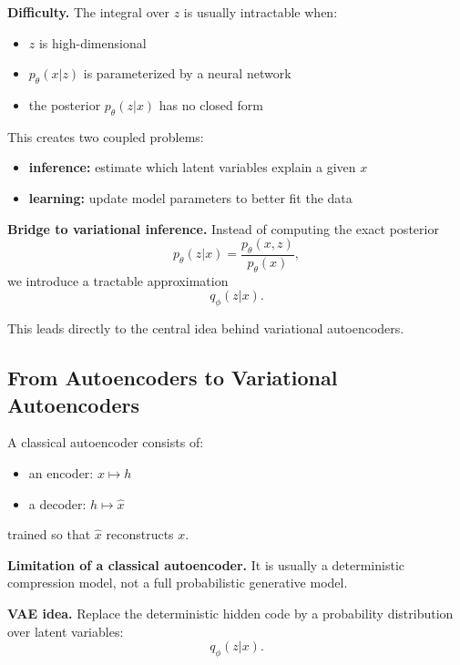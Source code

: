 \medskip

\noindent
\textbf{Difficulty.}  
The integral over $z$ is usually intractable when:
\begin{itemize}
    \item $z$ is high-dimensional
    \item $p_\theta(x|z)$ is parameterized by a neural network
    \item the posterior $p_\theta(z|x)$ has no closed form
\end{itemize}

\medskip

\noindent
This creates two coupled problems:

\begin{itemize}
    \item \textbf{inference:} estimate which latent variables explain a given $x$
    \item \textbf{learning:} update model parameters to better fit the data
\end{itemize}

\medskip

\noindent
\textbf{Bridge to variational inference.}  
Instead of computing the exact posterior
\[
p_\theta(z|x)=\frac{p_\theta(x,z)}{p_\theta(x)},
\]
we introduce a tractable approximation
\[
q_\phi(z|x).
\]

\medskip

\noindent
This leads directly to the central idea behind variational autoencoders.

\subsection{From Autoencoders to Variational Autoencoders}

A classical autoencoder consists of:
\begin{itemize}
    \item an encoder: $x \mapsto h$
    \item a decoder: $h \mapsto \hat{x}$
\end{itemize}

trained so that $\hat{x}$ reconstructs $x$.

\medskip

\noindent
\textbf{Limitation of a classical autoencoder.}  
It is usually a deterministic compression model, not a full probabilistic generative model.

\medskip

\noindent
\textbf{VAE idea.}  
Replace the deterministic hidden code by a probability distribution over latent variables:
\[
q_\phi(z|x).
\]

